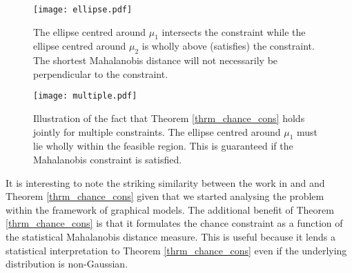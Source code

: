 \begin{figure}[H] 
\centering
\texttt{[image: ellipse.pdf]}
\caption{The ellipse centred around $\mu_1$ intersects the constraint while the ellipse centred around $\mu_2$ is wholly above (satisfies) the constraint. The shortest Mahalanobis distance will not necessarily be perpendicular to the constraint.}
\label{fig_mahala_ellipse}
\end{figure}
\begin{figure}[H] 
\centering
\texttt{[image: multiple.pdf]}
\caption{Illustration of the fact that Theorem \ref{thrm_chance_cons} holds jointly for multiple constraints. The ellipse centred around $\mu_1$ must lie wholly within the feasible region. This is guaranteed if the Mahalanobis constraint is satisfied.}
\label{fig_mahala_ellipse_joint}
\end{figure}
It is interesting to note the striking similarity between the work in \cite{vanhessem1} and \cite{vanhessem2} and Theorem \ref{thrm_chance_cons} given that we started analysing the problem within the framework of graphical models. The additional benefit of Theorem \ref{thrm_chance_cons} is that it formulates the chance constraint as a function of the statistical Mahalanobis distance measure. This is useful because it lends a statistical interpretation to Theorem \ref{thrm_chance_cons} even if the underlying distribution is non-Gaussian.

